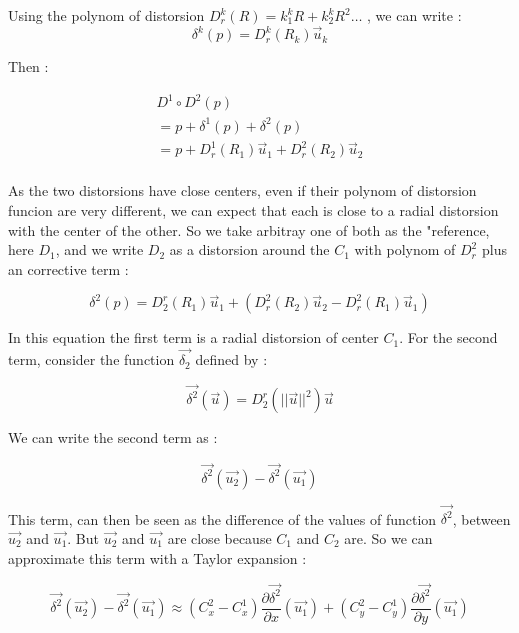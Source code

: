 Using the polynom  of distorsion $D^k_r(R) = k^k_1 R + k^k_2 R^2  \dots$  , we can write :
\begin{equation}
	\delta^k(p) =   D^k_r(R_k) \vec{u}_k 
\end{equation}

Then :

\begin{equation}
\begin{multlined}
	D^1 \circ D^2 (p)  \\
	= p +\delta^1(p) +\delta^2(p) \\
	= p +    D^1_r(R_1) \vec{u}_1  +  D^2_r(R_2) \vec{u}_2  \\
\end{multlined}
\end{equation}

As the two distorsions have close centers, even if their polynom of distorsion funcion are very different,
we can expect that each is close to a radial distorsion with the center of the other.
So we take arbitray one of both as the "reference, here  $D_1$,
and we write $D_2$ as a distorsion around the $C_1$ with polynom of $D^2_r$  plus an corrective term :

\begin{equation}
	\delta^2(p) =   D^r_2(R_1) \vec{u}_1  + ( D^2_r(R_2) \vec{u}_2 - D^2_r(R_1) \vec{u}_1 )
\end{equation}

In this equation the first term is a radial distorsion of center $C_1$. For the second term,
consider the function $\vec{\delta_2}$ defined by :

\begin{equation}
	\vec{\delta^2}(\vec{u}) =  D^r_2(||\vec{u}||^2) \vec{u}
\end{equation}

We can write the second term as :

\begin{equation}
	\vec{\delta^2}(\vec{u_2})  - \vec{\delta^2}(\vec{u_1})
\end{equation}

This term, can then be seen as the difference of the values of function $\vec{\delta^2}$, between $\vec{u_2}$
and $\vec{u_1}$.  But $\vec{u_2}$ and $\vec{u_1}$ are close because
$C_1$ and $C_2$ are. So we can approximate this term with  a Taylor expansion :

\begin{equation}
	\vec{\delta^2}(\vec{u_2})  - \vec{\delta^2}(\vec{u_1})
	\approx
	(C^2_x - C^1_x) \frac{\partial{\vec{\delta^2}}}{\partial x} (\vec{u_1})
     + 	(C^2_y - C^1_y) \frac{\partial{\vec{\delta^2}}}{\partial y}  (\vec{u_1})
\end{equation}

